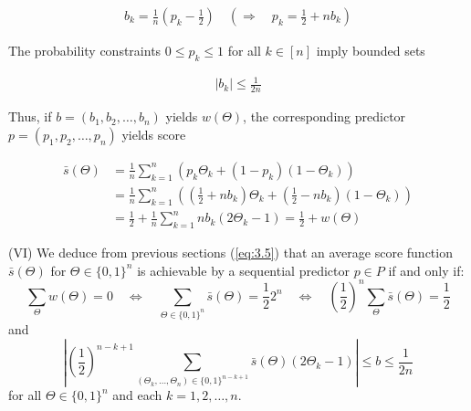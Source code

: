 \documentclass[11pt]{article}
\numberwithin{equation}{section}
\theoremstyle{boldStyle}
\begin{document}
\begin{align} \label{eq:4.2}
    b_k = \frac{1}{n} (p_k - \frac{1}{2}) \quad  \left(  \Rightarrow \quad p_k = \frac{1}{2} + n b_k \right)
\end{align}


The probability constraints $0 \leq p_k \leq 1$ for all $k \in [n]$ imply bounded sets 

\begin{align} \label{eq:4.3}
    \left| b_k \right| \leq \frac{1}{2n}
\end{align}

Thus, if $b = (b_1, b_2, \ldots, b_n)$ yields $w(\Theta)$, the corresponding predictor $p = (p_1, p_2, \ldots, p_n)$ yields score 

\begin{equation} \label{eq:4.4}
    \begin{aligned}
        \bar{s}(\Theta) &= \frac{1}{n} \sum_{k=1}^{n} \left( p_k \Theta_k + (1 - p_k)(1 - \Theta_k) \right) \\
            &= \frac{1}{n} \sum_{k=1}^{n} \left( (\frac{1}{2} + n b_k ) \Theta_k + (\frac{1}{2} - n b_k)(1 - \Theta_k) \right) \\ 
            &= \frac{1}{2} + \frac{1}{n} \sum_{k=1}^{n} n b_k(2 \Theta_k - 1) = \frac{1}{2} + w(\Theta)
    \end{aligned}
\end{equation}


\begin{boxA}
    (VI) We deduce from previous sections (\ref{eq:3.5}) that an average score function $\bar{s}(\Theta)$ for 
    $\Theta \in \{0, 1\}^n$ is achievable by a sequential predictor
    $p \in P$ if and only if:
    \begin{equation} \label{eq:4.5}
        \sum_{\Theta} w(\Theta) = 0 \quad 
        \iff \quad \sum_{\Theta \in \{0, 1\}^n} \bar{s}(\Theta) = \frac{1}{2}  2^n \quad 
        \iff \quad \left(\frac{1}{2}\right)^n \sum_{\Theta} \bar{s}(\Theta) = \frac{1}{2}
    \end{equation}
    and
    \begin{equation} \label{eq:4.6}
        \left| \left(\frac{1}{2}\right)^{n-k+1} \sum_{(\Theta_k, \ldots, \Theta_n) \in \{0,1\}^{n-k+1}} \bar{s}(\Theta) (2\Theta_k - 1) \right| \leq b \leq \frac{1}{2n}
    \end{equation}
    for all $\Theta \in \{0, 1\}^n$ and each $k = 1, 2, \ldots, n$.
\end{boxA}

\bigbreak
\end{document}
